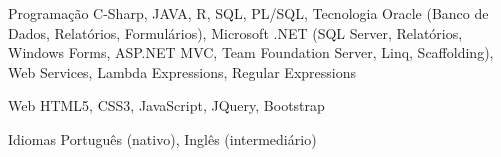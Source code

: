 

\begin{cvskills}

  \cvskill
    {Programação} %
    {C-Sharp, JAVA, R, SQL, PL/SQL, Tecnologia Oracle (Banco de Dados, Relatórios, Formulários), Microsoft .NET (SQL Server, Relatórios, Windows Forms, ASP.NET MVC, Team Foundation Server, Linq, Scaffolding), Web Services, Lambda Expressions, Regular Expressions} %

  \cvskill
    {Web} %
    {HTML5, CSS3, JavaScript, JQuery, Bootstrap} %

  \cvskill
    {Idiomas} %
    {Português (nativo), Inglês (intermediário)} %

\end{cvskills}
